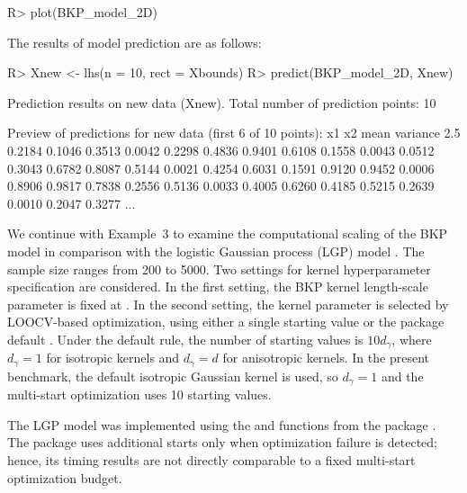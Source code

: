 \documentclass[article, shortnames]{jss}
\newcommand{\fct}[1]{\code{#1()}}
\begin{document}
\begin{CodeChunk}
\begin{CodeInput}  
R> plot(BKP_model_2D) 
\end{CodeInput} 
\end{CodeChunk}

The results of model prediction are as follows:

\begin{CodeChunk}
\begin{CodeInput}
R> Xnew <- lhs(n = 10, rect = Xbounds)
R> predict(BKP_model_2D, Xnew)
\end{CodeInput}
\begin{CodeOutput}
Prediction results on new data (Xnew).
Total number of prediction points: 10 

Preview of predictions for new data (first 6 of 10 points):
     x1     x2   mean variance 2.5%
 0.2184 0.1046 0.3513   0.0042        0.2298         0.4836
 0.9401 0.6108 0.1558   0.0043        0.0512         0.3043
 0.6782 0.8087 0.5144   0.0021        0.4254         0.6031
 0.1591 0.9120 0.9452   0.0006        0.8906         0.9817
 0.7838 0.2556 0.5136   0.0033        0.4005         0.6260
 0.4185 0.5215 0.2639   0.0010        0.2047         0.3277
 ...
\end{CodeOutput}
\end{CodeChunk} 

We continue with Example~3 to examine the computational scaling of the BKP model in comparison with the logistic Gaussian process (LGP) model \citep{Rasmussen2006GPML}. 
The sample size ranges from 200 to 5000. 
Two settings for kernel hyperparameter specification are considered. 
In the first setting, the BKP kernel length-scale parameter is fixed at . 
In the second setting, the kernel parameter is selected by LOOCV-based optimization, using either a single starting value  or the package default . 
Under the default rule, the number of starting values is $10d_\gamma$, where $d_\gamma = 1$ for isotropic kernels and $d_\gamma = d$ for anisotropic kernels. 
In the present benchmark, the default isotropic Gaussian kernel is used, so $d_\gamma = 1$ and the multi-start optimization uses 10 starting values.

The LGP model was implemented using the \fct{gp\_fit} and \fct{gp\_optim} functions from the  package \citep{Piironen2022gplite}. 
The  package uses additional starts only when optimization failure is detected; hence, its timing results are not directly comparable to a fixed multi-start optimization budget.
\end{document}
